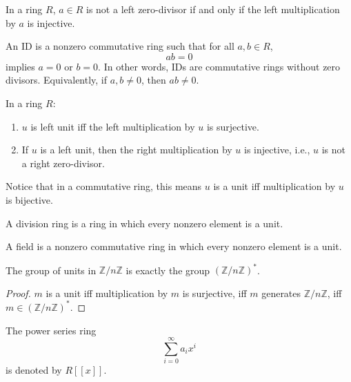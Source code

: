 \documentclass[openany]{book}
\newcommand{\Z}{\mathbb{Z}}
\begin{document}
\begin{prop}
    In a ring $R$, $a\in R$ is not a left zero-divisor if and only if the left multiplication by $a$ is injective.
\end{prop}

\begin{defn}
    An ID is a nonzero commutative ring such that for all $a,b\in R$, 
    \begin{equation*}
        ab=0
    \end{equation*}
    implies $a=0$ or $b=0$. In other words, IDs are commutative rings without zero divisors. Equivalently, if $a,b\neq 0$, then $ab\neq 0$.
\end{defn}


\begin{prop}
    In a ring $R$:
    \begin{enumerate}
        \item $u$ is left unit iff the left multiplication by $u$ is surjective. 
        \item If $u$ is a left unit, then the right multiplication by $u$ is injective, i.e., $u$ is not a right zero-divisor.
    \end{enumerate}
\end{prop}
Notice that in a commutative ring, this means $u$ is a unit iff multiplication by $u$ is bijective.

\begin{defn}
    A division ring is a ring in which every nonzero element is a unit.

    A field is a nonzero commutative ring in which every nonzero element is a unit.
\end{defn}


\begin{prop}
    The group of units in $\Z/n\Z$ is exactly the group $(\Z/n\Z)^*$.
\end{prop}
\begin{proof}
    $m$ is a unit iff multiplication by $m$ is surjective, iff $m$ generates $\Z/n\Z$, iff $m\in(\Z/n\Z)^*$.
\end{proof}

\begin{defn}
    The power series ring 
    \begin{equation*}
        \sum_{i=0}^\infty a_ix^i
    \end{equation*}
    is denoted by $R[[x]]$.
\end{defn}
\end{document}
